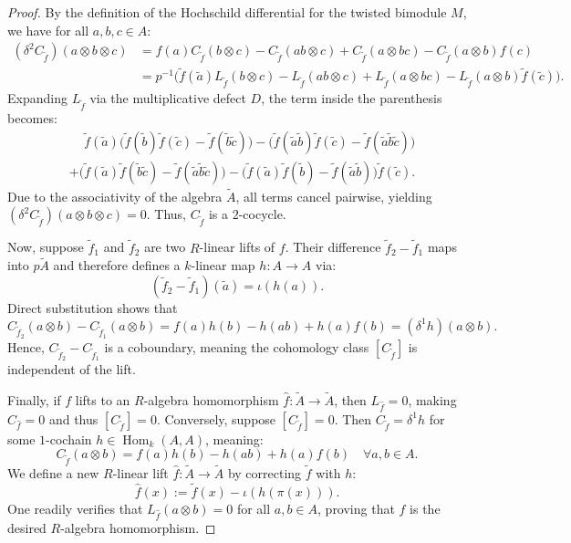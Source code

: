 \documentclass[10pt,a4paper]{amsart}
\newcommand{\Hom}{\operatorname{Hom}}
\newcommand{\lA}{\widetilde{A}}
\newcommand{\lf}{\widetilde{f}}
\begin{document}
\begin{proof}
By the definition of the Hochschild differential for the twisted bimodule $M$, we have for all $a,b,c \in A$:
\begin{align*} 
(\delta^2 C_{\lf})(a \otimes b \otimes c) &= f(a) C_{\lf}(b \otimes c) - C_{\lf}(ab \otimes c) + C_{\lf}(a \otimes bc) - C_{\lf}(a \otimes b) f(c) \\
&= p^{-1} \Big( \lf(\tilde{a}) L_{\lf}(b \otimes c) - L_{\lf}(ab \otimes c) + L_{\lf}(a \otimes bc) - L_{\lf}(a \otimes b) \lf(\tilde{c}) \Big).
\end{align*}
Expanding $L_{\lf}$ via the multiplicative defect $D$, the term inside the parenthesis becomes:
\begin{align*}
&\quad\, \lf(\tilde{a}) \big( \lf(\tilde{b})\lf(\tilde{c}) - \lf(\tilde{b}\tilde{c}) \big) - \big( \lf(\tilde{a}\tilde{b})\lf(\tilde{c}) - \lf(\tilde{a}\tilde{b}\tilde{c}) \big) \\
&+ \big( \lf(\tilde{a})\lf(\tilde{b}\tilde{c}) - \lf(\tilde{a}\tilde{b}\tilde{c}) \big) - \big( \lf(\tilde{a})\lf(\tilde{b}) - \lf(\tilde{a}\tilde{b}) \big) \lf(\tilde{c}).
\end{align*}
Due to the associativity of the algebra $\lA$, all terms cancel pairwise, yielding $(\delta^2 C_{\lf})(a \otimes b \otimes c) = 0$. Thus, $C_{\lf}$ is a $2$-cocycle.

Now, suppose $\lf_1$ and $\lf_2$ are two $R$-linear lifts of $f$. Their difference $\lf_2 - \lf_1$ maps into $p\lA$ and therefore defines a $k$-linear map $h: A \to A$ via:
$$
(\lf_2 - \lf_1)(\tilde{a}) = \iota(h(a)).
$$
Direct substitution shows that
$$
C_{\lf_2}(a \otimes b) - C_{\lf_1}(a \otimes b) = f(a)h(b) - h(ab) + h(a)f(b) = (\delta^1 h)(a \otimes b).
$$
Hence, $C_{\lf_2} - C_{\lf_1}$ is a coboundary, meaning the cohomology class $[C_{\lf}]$ is independent of the lift.

Finally, if $f$ lifts to an $R$-algebra homomorphism $\widehat{f}: \lA \to \lA$, then $L_{\widehat{f}} = 0$, making $C_{\widehat{f}} = 0$ and thus $[C_{\lf}] = 0$. Conversely, suppose $[C_{\lf}] = 0$. Then $C_{\lf} = \delta^1 h$ for some $1$-cochain $h \in \Hom_k(A,A)$, meaning:
$$
C_{\lf}(a \otimes b) = f(a)h(b) - h(ab) + h(a)f(b) \quad \forall a,b \in A.
$$
We define a new $R$-linear lift $\widehat{f}: \lA \to \lA$ by correcting $\lf$ with $h$:
$$
\widehat{f}(x) := \lf(x) - \iota(h(\pi(x))).
$$
One readily verifies that $L_{\widehat{f}}(a \otimes b) = 0$ for all $a,b \in A$, proving that $\widehat{f}$ is the desired $R$-algebra homomorphism.
\end{proof}
\end{document}
